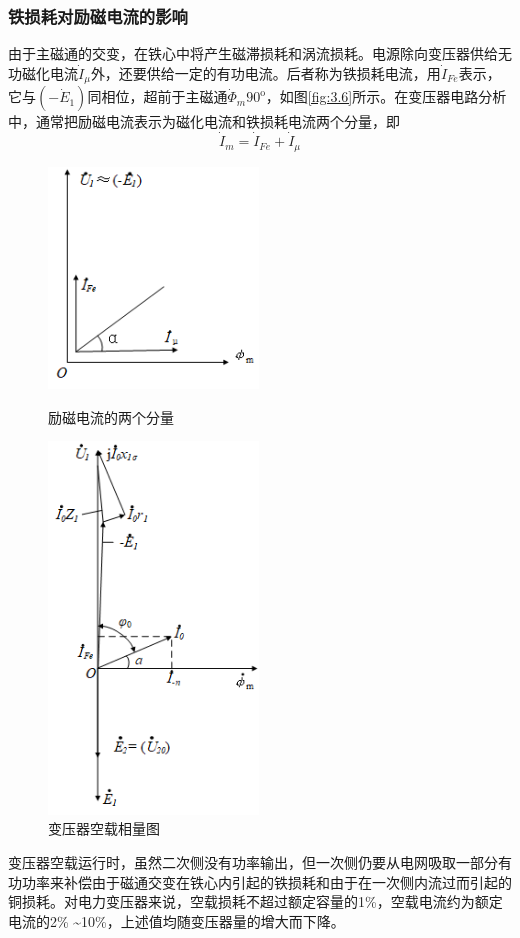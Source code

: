 \documentclass{book}
\begin{document}
\subsubsection{铁损耗对励磁电流的影响}
由于主磁通的交变，在铁心中将产生磁滞损耗和涡流损耗。电源除向变压器供给无功磁化电流${{\dot{I}}_{\mu }}$外，还要供给一定的有功电流。后者称为铁损耗电流，用${{\dot{I}}_{Fe}}$表示，它与$\left( -{{{\dot{E}}}_{1}} \right)$同相位，超前于主磁通${{\dot{\Phi }}_{m}}$${{90}^{\text{o}}}$，如图\ref{fig:3.6}所示。在变压器电路分析中，通常把励磁电流表示为磁化电流和铁损耗电流两个分量，即
\begin{equation}
{{\dot{I}}_{m}}={{\dot{I}}_{Fe}}+{{\dot{I}}_{\mu }}
\label{2-14}
\end{equation}

\begin{figure}  %
	\begin{minipage}[H]{0.45\linewidth}  
		\centering  
		\includegraphics[width=2.2in]{3-6g.png}  
		\caption{励磁电流的两个分量}
		\label{fig:3.6} 
	\end{minipage}
	\begin{minipage}[H]{0.45\linewidth}  
		\centering  
		\includegraphics[width=2.2in]{3-7g.png}  
		\caption{变压器空载相量图} 
		\label{fig:3.7} 
	\end{minipage}
\end{figure}
变压器空载运行时，虽然二次侧没有功率输出，但一次侧仍要从电网吸取一部分有功功率来补偿由于磁通交变在铁心内引起的铁损耗和由于在一次侧内流过而引起的铜损耗。对电力变压器来说，空载损耗不超过额定容量的1\%，空载电流约为额定电流的2\% \textasciitilde10\%，上述值均随变压器量的增大而下降。
\end{document}
